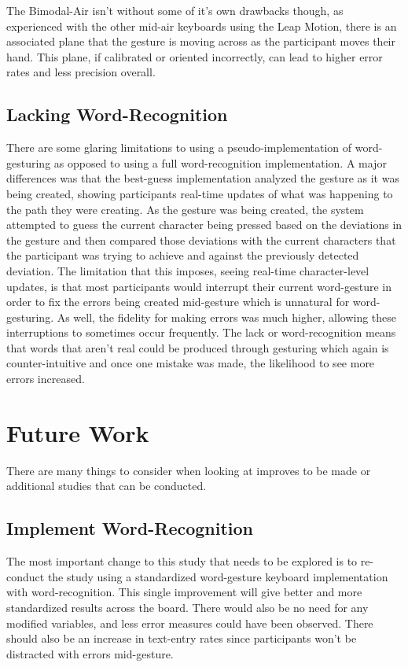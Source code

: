 The Bimodal-Air isn't without some of it's own drawbacks though, as experienced with the other mid-air keyboards using the Leap Motion, there is an associated plane that the gesture is moving across as the participant moves their hand. This plane, if calibrated or oriented incorrectly, can lead to higher error rates and less precision overall.

\subsection{Lacking Word-Recognition}
There are some glaring limitations to using a pseudo-implementation of word-gesturing as opposed to using a full word-recognition implementation. A major differences was that the best-guess implementation analyzed the gesture as it was being created, showing participants real-time updates of what was happening to the path they were creating. As the gesture was being created, the system attempted to guess the current character being pressed based on the deviations in the gesture and then compared those deviations with the current characters that the participant was trying to achieve and against the previously detected deviation. The limitation that this imposes, seeing real-time character-level updates, is that most participants would interrupt their current word-gesture in order to fix the errors being created mid-gesture which is unnatural for word-gesturing. As well, the fidelity for making errors was much higher, allowing these interruptions to sometimes occur frequently. The lack or word-recognition means that words that aren't real could be produced through gesturing which again is counter-intuitive and once one mistake was made, the likelihood to see more errors increased.

\section{Future Work}
There are many things to consider when looking at improves to be made or additional studies that can be conducted.

\subsection{Implement Word-Recognition}
The most important change to this study that needs to be explored is to re-conduct the study using a standardized word-gesture keyboard implementation with word-recognition. This single improvement will give better and more standardized results across the board. There would also be no need for any modified variables, and less error measures could have been observed. There should also be an increase in text-entry rates since participants won't be distracted with errors mid-gesture.

